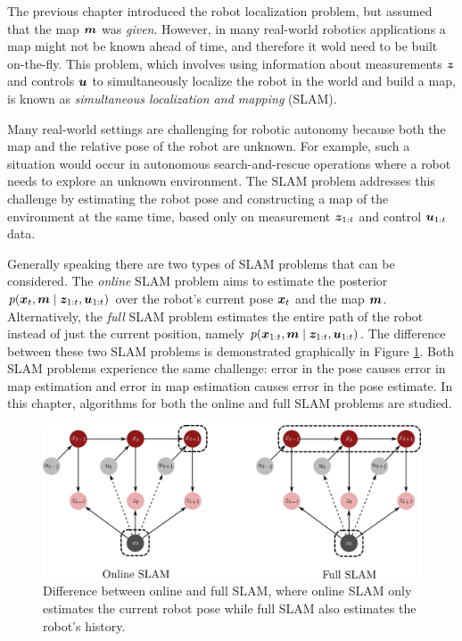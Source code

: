 The previous chapter introduced the robot localization problem, but assumed that the map $\bm{m}$ was \textit{given}. However, in many real-world robotics applications a map might not be known ahead of time, and therefore it wold need to be built on-the-fly. This problem, which involves using information about measurements $\bm{z}$ and controls $\bm{u}$ to simultaneously localize the robot in the world and build a map, is known as \textit{simultaneous localization and mapping} (SLAM)\cite{ThrunBurgardEtAl2005}.

Many real-world settings are challenging for robotic autonomy because both the map and the relative pose of the robot are unknown. For example, such a situation would occur in autonomous search-and-rescue operations where a robot needs to explore an unknown environment. The SLAM problem addresses this challenge by estimating the robot pose and constructing a map of the environment at the same time, based only on measurement $\bm{z}_{1:t}$ and control $\bm{u}_{1:t}$ data.

Generally speaking there are two types of SLAM problems that can be considered. The \textit{online} SLAM problem aims to estimate the posterior $p(\bm{x}_t, \bm{m}\mid \bm{z}_{1:t}, \bm{u}_{1:t})$ over the robot's current pose $\bm{x}_t$ and the map $\bm{m}$. Alternatively, the \textit{full} SLAM problem estimates the entire path of the robot instead of just the current position, namely $p(\bm{x}_{1:t}, \bm{m}\mid \bm{z}_{1:t}, \bm{u}_{1:t})$. The difference between these two SLAM problems is demonstrated graphically in Figure \ref{fig:online_full_slam}. Both SLAM problems experience the same challenge: error in the pose causes error in map estimation and error in map estimation causes error in the pose estimate. In this chapter, algorithms for both the online and full SLAM problems are studied.
\begin{figure}[ht]
    \centering
    \includegraphics[width=.75\textwidth]{tex/figs/ch18_figs/online_full_slam.png}
    \caption{Difference between online and full SLAM, where online SLAM only estimates the current robot pose while full SLAM also estimates the robot's history.}
    \label{fig:online_full_slam}
\end{figure}


